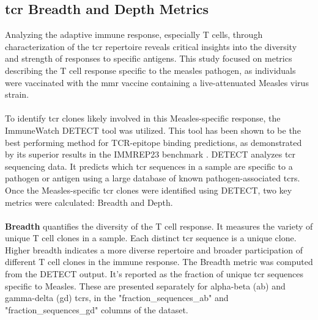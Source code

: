 \documentclass[12pt,a4paper]{report}
\begin{document}
\subsection{\gls{tcr} Breadth and Depth Metrics}
Analyzing the adaptive immune response, especially T cells, through characterization of the \gls{tcr} repertoire reveals critical insights into the diversity and strength of responses to specific antigens. This study focused on metrics describing the T cell response specific to the measles pathogen, as individuals were vaccinated with the \gls{mmr} vaccine containing a live-attenuated Measles virus strain.\\
\\
To identify \gls{tcr} clones likely involved in this Measles-specific response, the ImmuneWatch DETECT tool \cite{ImmuneDetectDocs} was utilized. This tool has been shown to be the best performing method for TCR-epitope binding predictions, as demonstrated by its superior results in the IMMREP23 benchmark \cite{benchmarking_paper_2024}. DETECT analyzes \gls{tcr} sequencing data. It predicts which \gls{tcr}  sequences in a sample are specific to a pathogen or antigen using a large database of known pathogen-associated \gls{tcr}s. Once the Measles-specific \gls{tcr} clones were identified using DETECT, two key metrics were calculated: Breadth and Depth.\\
\\
\textbf{Breadth} quantifies the diversity of the T cell response. It measures the variety of unique T cell clones in a sample. Each distinct \gls{tcr} sequence is a unique clone. Higher breadth indicates a more diverse repertoire and broader participation of different T cell clones in the immune response. The Breadth metric was computed from the DETECT output. It's reported as the fraction of unique \gls{tcr} sequences specific to Measles. These are presented separately for alpha-beta (ab) and gamma-delta (gd) \gls{tcr}s, in the "fraction\_sequences\_ab" and "fraction\_sequences\_gd" columns of the dataset.\\
\\
\end{document}
